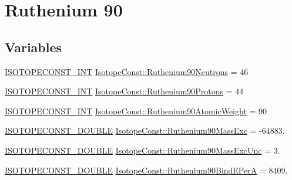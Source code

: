 \hypertarget{group___isotope_const-_ruthenium-_ru90}{}\section{Ruthenium 90}
\label{group___isotope_const-_ruthenium-_ru90}
\subsection*{Variables}
\begin{DoxyCompactItemize}
\item 
\mbox{\hyperlink{group___isotope_const-_macros_ga5f18360b3e99483a35c32d789e62621c}{I\+S\+O\+T\+O\+P\+E\+C\+O\+N\+S\+T\+\_\+\+I\+NT}} \mbox{\hyperlink{group___isotope_const-_ruthenium-_ru90_ga1c19bc2368a7e453b58f3d883983ed37}{Isotope\+Const\+::\+Ruthenium90\+Neutrons}} = 46
\item 
\mbox{\hyperlink{group___isotope_const-_macros_ga5f18360b3e99483a35c32d789e62621c}{I\+S\+O\+T\+O\+P\+E\+C\+O\+N\+S\+T\+\_\+\+I\+NT}} \mbox{\hyperlink{group___isotope_const-_ruthenium-_ru90_ga2f16f687cf2a2c9c95578e48dbc9a6a3}{Isotope\+Const\+::\+Ruthenium90\+Protons}} = 44
\item 
\mbox{\hyperlink{group___isotope_const-_macros_ga5f18360b3e99483a35c32d789e62621c}{I\+S\+O\+T\+O\+P\+E\+C\+O\+N\+S\+T\+\_\+\+I\+NT}} \mbox{\hyperlink{group___isotope_const-_ruthenium-_ru90_gae461a7e7086bc7fca451e1158ebcd633}{Isotope\+Const\+::\+Ruthenium90\+Atomic\+Weight}} = 90
\item 
\mbox{\hyperlink{group___isotope_const-_macros_ga8f45a7272ce02c0b4c65c44636ed719a}{I\+S\+O\+T\+O\+P\+E\+C\+O\+N\+S\+T\+\_\+\+D\+O\+U\+B\+LE}} \mbox{\hyperlink{group___isotope_const-_ruthenium-_ru90_ga6b201388b7125d9988d28b77d166032a}{Isotope\+Const\+::\+Ruthenium90\+Mass\+Exc}} = -\/64883.
\item 
\mbox{\hyperlink{group___isotope_const-_macros_ga8f45a7272ce02c0b4c65c44636ed719a}{I\+S\+O\+T\+O\+P\+E\+C\+O\+N\+S\+T\+\_\+\+D\+O\+U\+B\+LE}} \mbox{\hyperlink{group___isotope_const-_ruthenium-_ru90_ga1970d1980c7c0aa3b5af555245940f93}{Isotope\+Const\+::\+Ruthenium90\+Mass\+Exc\+Unc}} = 3.
\item 
\mbox{\hyperlink{group___isotope_const-_macros_ga8f45a7272ce02c0b4c65c44636ed719a}{I\+S\+O\+T\+O\+P\+E\+C\+O\+N\+S\+T\+\_\+\+D\+O\+U\+B\+LE}} \mbox{\hyperlink{group___isotope_const-_ruthenium-_ru90_ga4a8884ac6b3df4669f30a10636a86275}{Isotope\+Const\+::\+Ruthenium90\+Bind\+E\+PerA}} = 8409.
\item 

\end{DoxyCompactItemize}
